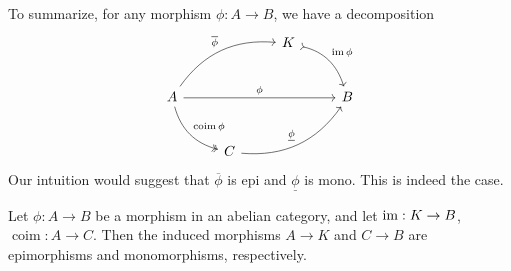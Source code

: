 To summarize, for any morphism $\phi : A \to B$, we have a decomposition
\[\begin{tikzcd}[row sep = 2.5em, column sep = 2.5em]
	&&K\arrow[dr, bend left, tail, "\im \phi "]\\
	A\arrow[rrr, "\phi "]\arrow[dr, bend right, two heads, "\operatorname{coim} \phi "]\arrow[urr, bend left, " \overline{\phi } "]&&&B\\
			     &C\arrow[rru, bend right, " \underline{\phi }"]
\end{tikzcd}\]
Our intuition would suggest that $\overline{\phi } $ is epi and $\underline{\phi }$ is mono. This is indeed the case.
\begin{lemma}\label{lma:9.7}
	Let $\phi : A \to B$ be a morphism in an abelian category, and let $\operatorname{im} : K \to B$, $\operatorname{coim} : A \to C$. Then the induced morphisms $A\to K$ and $C\to B$ are epimorphisms and monomorphisms, respectively.
\end{lemma}
